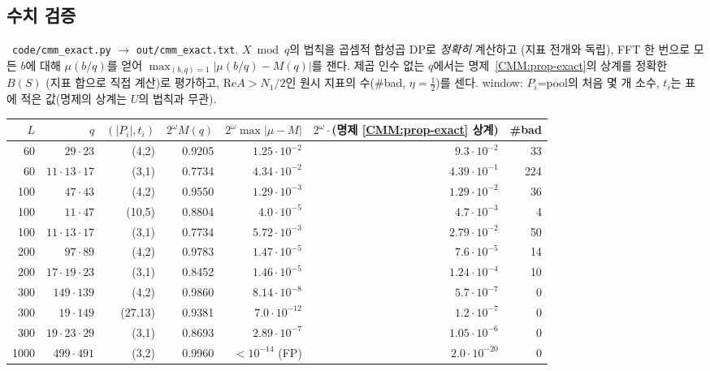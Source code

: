 \subsection{수치 검증}\label{CMM:ssec-num}

\NUMERIC\ \texttt{code/cmm\_exact.py} $\to$ \texttt{out/cmm\_exact.txt}. $X\bmod q$의 법칙을 곱셈적 합성곱 DP로 \emph{정확히} 계산하고
(지표 전개와 독립), FFT 한 번으로 모든 $b$에 대해 $\mu(b/q)$를 얻어 $\max_{(b,q)=1}|\mu(b/q)-M(q)|$를 잰다. 제곱 인수 없는 $q$에서는
명제~\ref{CMM:prop-exact}의 상계를 정확한 $B(S)$ (지표 합으로 직접 계산)로 평가하고, $\mathrm{Re}A>N_1/2$인 원시 지표의 수(\#bad, $\eta=\frac12$)를 센다.
window: $P_i$=pool의 처음 몇 개 소수, $t_i$는 표에 적은 값(명제의 상계는 $U$의 법칙과 무관).
\begin{center}\small
\begin{tabular}{rrrrrrr}
\toprule
$L$ & $q$ & $(|P_i|,t_i)$ & $2^\omega M(q)$ & $2^\omega\max|\mu-M|$ & $2^\omega\cdot$(명제 \ref{CMM:prop-exact} 상계) & \#bad\\
\midrule
60 & $29\cdot23$ & (4,2) & 0.9205 & $1.25\cdot10^{-2}$ & $9.3\cdot10^{-2}$ & 33\\
60 & $11\cdot13\cdot17$ & (3,1) & 0.7734 & $4.34\cdot10^{-2}$ & $4.39\cdot10^{-1}$ & 224\\
100 & $47\cdot43$ & (4,2) & 0.9550 & $1.29\cdot10^{-3}$ & $1.29\cdot10^{-2}$ & 36\\
100 & $11\cdot47$ & (10,5) & 0.8804 & $4.0\cdot10^{-5}$ & $4.7\cdot10^{-3}$ & 4\\
100 & $11\cdot13\cdot17$ & (3,1) & 0.7734 & $5.72\cdot10^{-3}$ & $2.79\cdot10^{-2}$ & 50\\
200 & $97\cdot89$ & (4,2) & 0.9783 & $1.47\cdot10^{-5}$ & $7.6\cdot10^{-5}$ & 14\\
200 & $17\cdot19\cdot23$ & (3,1) & 0.8452 & $1.46\cdot10^{-5}$ & $1.24\cdot10^{-4}$ & 10\\
300 & $149\cdot139$ & (4,2) & 0.9860 & $8.14\cdot10^{-8}$ & $5.7\cdot10^{-7}$ & 0\\
300 & $19\cdot149$ & (27,13) & 0.9381 & $7.0\cdot10^{-12}$ & $1.2\cdot10^{-7}$ & 0\\
300 & $19\cdot23\cdot29$ & (3,1) & 0.8693 & $2.89\cdot10^{-7}$ & $1.05\cdot10^{-6}$ & 0\\
1000 & $499\cdot491$ & (3,2) & 0.9960 & $<10^{-14}$ (FP) & $2.0\cdot10^{-20}$ & 0\\

\end{tabular}
\end{center}
